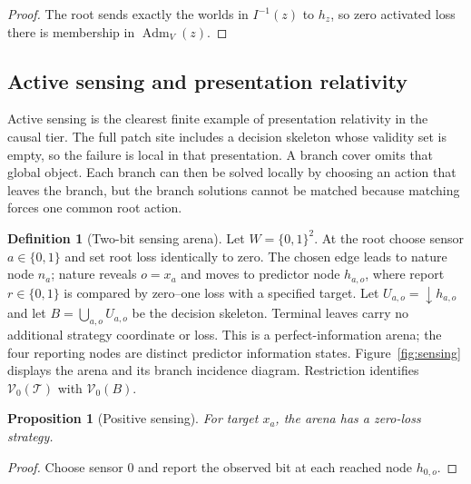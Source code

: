 \documentclass[11pt]{article}
\theoremstyle{plain}
\newtheorem{proposition}[theorem]{Proposition}
\theoremstyle{definition}
\newtheorem{definition}[theorem]{Definition}
\theoremstyle{remark}
\newcommand{\Adm}{\operatorname{Adm}}
\begin{document}
\begin{proof}
The root sends exactly the worlds in $I^{-1}(z)$ to $h_z$, so zero activated
loss there is membership in $\Adm_V(z)$.
\end{proof}

\subsection{Active sensing and presentation relativity}

Active sensing is the clearest finite example of presentation relativity in the
causal tier. The full patch site includes a decision skeleton whose validity set
is empty, so the failure is local in that presentation. A branch cover omits that
global object. Each branch can then be solved locally by choosing an action that
leaves the branch, but the branch solutions cannot be matched because matching
forces one common root action.

\begin{definition}[Two-bit sensing arena]\label{def:sensing}
Let $W=\{0,1\}^2$. At the root choose sensor $a\in\{0,1\}$ and set root loss
identically to zero. The chosen edge leads to nature node $n_a$; nature reveals
$o=x_a$ and moves to predictor node
$h_{a,o}$, where report $r\in\{0,1\}$ is compared by zero--one loss with a
specified target. Let
$U_{a,o}=\downarrow h_{a,o}$ and let
$B=\bigcup_{a,o}U_{a,o}$ be the decision skeleton. Terminal leaves carry no
additional strategy coordinate or loss. This is a perfect-information arena; the
four reporting nodes are distinct predictor information states. Figure~\ref{fig:sensing} displays the arena and its branch incidence diagram. Restriction identifies
$\mathscr V_0(\mathcal T)$ with $\mathscr V_0(B)$.
\end{definition}

\begin{proposition}[Positive sensing]\label{prop:sensing-positive}
For target $x_a$, the arena has a zero-loss strategy.
\end{proposition}

\begin{proof}
Choose sensor $0$ and report the observed bit at each reached node $h_{0,o}$.
\end{proof}
\end{document}
